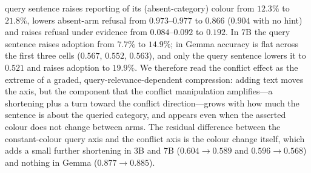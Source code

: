 \documentclass[10pt]{article}
\begin{document}
query sentence raises reporting of its (absent-category) colour from $12.3\%$
to $21.8\%$, lowers absent-arm refusal from $0.973$--$0.977$ to $0.866$
($0.904$ with no hint) and raises refusal under evidence from
$0.084$--$0.092$ to $0.192$. In 7B the query sentence raises adoption from
$7.7\%$ to $14.9\%$; in Gemma accuracy is flat across the first three cells
($0.567$, $0.552$, $0.563$), and only the query sentence lowers it to $0.521$
and raises adoption to $19.9\%$. We therefore read the conflict effect as the
extreme of a graded, query-relevance-dependent compression: adding text moves
the axis, but the component that the conflict manipulation amplifies---a
shortening plus a turn toward the conflict direction---grows with how much the
sentence is about the queried category, and appears even when the asserted
colour does not change between arms. The residual difference between the
constant-colour query axis and the conflict axis is the colour change itself,
which adds a small further shortening in 3B and 7B ($0.604\to0.589$ and
$0.596\to0.568$) and nothing in Gemma ($0.877\to0.885$).
\end{document}

